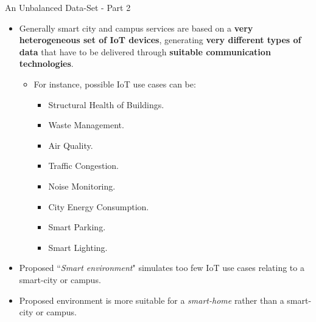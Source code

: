 \documentclass[13.5pt]{beamer}
\begin{document}
\begin{frame}{An Unbalanced Data-Set - Part 2}

\begin{itemize}
\justifying
\item Generally smart city and campus services are based on a \textbf{very heterogeneous set of IoT devices}, generating \textbf{very different types of data} that have to be delivered through \textbf{suitable communication technologies}.

\begin{itemize}
\item For instance, possible IoT use cases can be:

\begin{itemize}
\item Structural Health of Buildings.
\item Waste Management.
\item Air Quality.
\item Traffic Congestion.
\item Noise Monitoring.
\item City Energy Consumption.
\item Smart Parking.
\item Smart Lighting.
\end{itemize}

\end{itemize}
\end{itemize}

\begin{block}{}
\begin{itemize}
\item Proposed ``\textit{Smart environment}" simulates too few IoT use cases relating to a smart-city or campus.
\item Proposed environment is more suitable for a \textit{smart-home} rather than a smart-city or campus.
\end{itemize}

\end{block}

\end{frame} 
\end{document}
